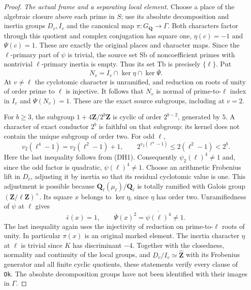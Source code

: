 \begin{proof}
\emph{The actual frame and a separating local element.}
Choose a place of the algebraic closure above each prime in $S$;
use its absolute decomposition and inertia groups $D_v,I_v$ and the
canonical map $\pi:G_{\mathbf Q}\to\Gamma$.  Both characters factor
through this quotient and complex conjugation has square one,
$\eta(c)=-1$ and $\Psi(c)=1$.  These are exactly the original
places and character maps.  Since the $\ell$-primary part of $\psi$
is trivial, the source set $\mathrm{Sb}$ of noncoefficient primes
with nontrivial $\ell$-primary inertia is empty.  Thus its set
$\mathrm{Tb}$ is precisely $\{\ell\}$.  Put
\[
        N_v=I_v\cap\ker\eta\cap\ker\overline\Psi .
\]
At $v\ne\ell$ the cyclotomic character is unramified, and
reduction on roots of unity of order prime to $\ell$ is injective.
It follows that $N_v$ is normal of prime-to-$\ell$ index in $I_v$
and $\Psi(N_v)=1$.  These are the exact source subgroups,
including at $v=2$.

For $b\ge3$, the subgroup $1+4\mathbf Z/2^b\mathbf Z$ is cyclic
of order $2^{b-2}$, generated by $5$.  A character of exact conductor
$2^b$ is faithful on that subgroup: its kernel does not contain the
unique subgroup of order two.  For odd $\ell$,
\[
   v_2(\ell^4-1)=v_2(\ell^2-1)+1,\qquad
   2^{v_2(\ell^4-1)}\le2(\ell^2-1)<2^b.
\]
Here the last inequality follows from (DH1).  Consequently
$\psi_2(\ell)^4\ne1$ and, since the odd factor is quadratic,
$\psi(\ell)^4\ne1$.  Choose an arithmetic Frobenius lift in $D_\ell$,
adjusting it by inertia so that its residual cyclotomic value is
one.  This adjustment is possible because
$\mathbf Q_\ell(\mu_\ell)/\mathbf Q_\ell$ is totally ramified with
Galois group $(\mathbf Z/\ell\mathbf Z)^\times$.
Its square $x$ belongs to $\ker\eta$, since $\eta$ has order two.
Unramifiedness of $\psi$ at $\ell$ gives
\begin{equation}
 \bar\epsilon(x)=1,\qquad
 \overline\Psi(x)^2=\overline{\psi(\ell)^4}\ne1.                 \tag{DH3}
\end{equation}
The last inequality again uses the injectivity of reduction on
prime-to-$\ell$ roots of unity.  In particular $\pi(x)$ is an
original marked element.  The inertia character $\eta$ at $\ell$
is trivial since $K$ has discriminant $-4$.
Together with the closedness, normality and continuity of the
local groups, and $D_v/I_v\simeq\widehat{\mathbf Z}$ with its
Frobenius generator and all finite cyclic quotients, these statements
verify every clause of \texttt{Ok}.  The absolute decomposition
groups have not been identified with their images in $\Gamma$.


\end{proof}
